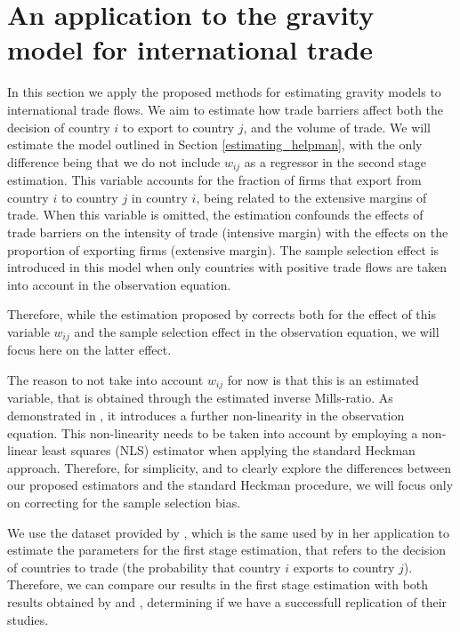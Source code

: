 \section{An application to the gravity model for international trade} \label{application}

In this section we apply the proposed methods for estimating gravity models to international trade flows. We aim to estimate how trade barriers affect both the decision of country $i$ to export to country $j$, and the volume of trade. We will estimate the model outlined in Section \ref{estimating_helpman}, with the only difference being that we do not include $w_{ij}$ as a regressor in the second stage estimation. This variable accounts for the fraction of firms that export from country $i$ to country $j$ in country $i$, being related to the extensive margins of trade. When this variable is omitted, the estimation confounds the effects of trade barriers on the intensity  of trade (intensive margin) with the effects on the proportion of exporting firms (extensive margin). The sample selection effect is introduced in this model when only countries with positive trade flows are taken into account in the observation equation.

Therefore, while the estimation proposed by \cite{helpman2008estimating} corrects both for the effect of this variable $w_{ij}$ and the sample selection effect in the observation equation, we will focus here on the latter effect. 

The reason to not take into account $w_{ij}$ for now is that this is an estimated variable, that is obtained through the estimated inverse Mills-ratio. As demonstrated in \cite{helpman2008estimating}, it introduces a further non-linearity in the observation equation. This non-linearity needs to be taken into account by employing a non-linear least squares (NLS) estimator when applying the standard Heckman approach. Therefore, for simplicity, and to clearly explore the differences between our proposed estimators and the standard Heckman procedure, we will focus only on correcting for the sample selection bias.

We use the dataset provided by \cite{helpman2008estimating}, which is the same used by \cite{charbonneau2017multiple} in her application to estimate the parameters for the first stage estimation, that refers to the decision of countries to trade (the probability that country $i$ exports to country $j$). Therefore, we can compare our results in the first stage estimation with both results obtained by \cite{helpman2008estimating} and \cite{charbonneau2017multiple}, determining if we have a successfull replication of their studies.

